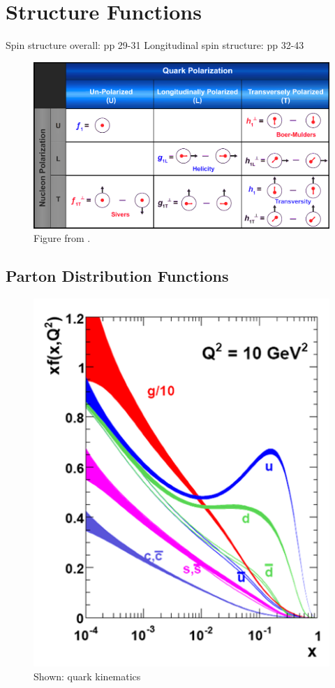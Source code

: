 \section{Structure Functions}
Spin structure overall: \cite{Accardi2012} pp 29-31
Longitudinal spin structure: \cite{Accardi2012} pp 32-43

\begin{figure}[ht]
  \centering
  \includegraphics[width=\linewidth]{./figures/leading_twist_polarization_config.png}
  \caption{
    Figure from \cite{Accardi2012}.
  }
  \label{fig:leadings_twist_probes}
\end{figure}

\subsection{Parton Distribution Functions}

\begin{figure}[ht]
  \centering
  \includegraphics[width=0.5\linewidth]{./figures/quark_kinematics.png}
  \caption{
    Shown: quark kinematics \needcap{} 
  }
  \label{fig:quark_kinematics}
\end{figure}


